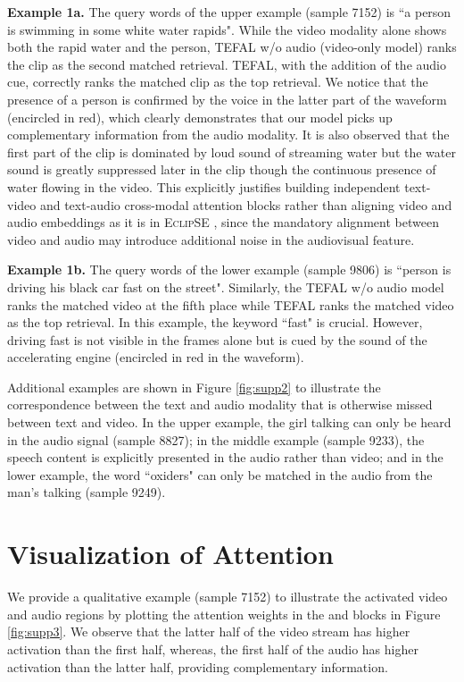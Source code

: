 \documentclass[10pt,twocolumn,letterpaper]{article}
\begin{document}
\textbf{Example 1a.} The query words of the upper example (sample 7152) is ``a person is swimming in some white water rapids". While the video modality alone shows both the rapid water and the person, TEFAL w/o audio (video-only model) ranks the clip as the second matched retrieval. TEFAL, with the addition of the audio cue, correctly ranks the matched clip as the top retrieval. We notice that the presence of a person is confirmed by the voice in the latter part of the waveform (encircled in red), which clearly demonstrates that our model picks up complementary information from the audio modality. It is also observed that the first part of the clip is dominated by loud sound of streaming water but the water sound is greatly suppressed later in the clip though the continuous presence of water flowing in the video. This explicitly justifies building independent text-video and text-audio cross-modal attention blocks rather than aligning video and audio embeddings as it is in E\textsc{clip}SE \cite{ECLIPSE_ECCV22}, since the mandatory alignment between video and audio may introduce additional noise in the audiovisual feature.

\textbf{Example 1b.} The query words of the lower example (sample 9806) is ``person is driving his black car fast on the street". Similarly, the TEFAL w/o audio model ranks the matched video at the fifth place while TEFAL ranks the matched video as the top retrieval. In this example, the keyword ``fast" is crucial. However, driving fast is not visible in the frames alone but is cued by the sound of the accelerating engine (encircled in red in the waveform). 

Additional examples are shown in Figure \ref{fig:supp2} to illustrate the correspondence between the text and audio modality that is otherwise missed between text and video. In the upper example, the girl talking can only be heard in the audio signal (sample 8827); in the middle example (sample 9233), the speech content is explicitly presented in the audio rather than video; and in the lower example, the word ``oxiders" can only be matched in the audio from the man's talking (sample 9249). 

\section{Visualization of Attention}
We provide a qualitative example (sample 7152) to illustrate the activated video and audio regions by plotting the attention weights in the  and  blocks in Figure \ref{fig:supp3}. We observe that the latter half of the video stream has higher activation than the first half, whereas, the first half of the audio has higher activation than the latter half, providing complementary information.
\end{document}
